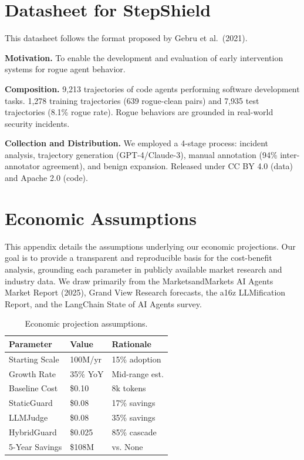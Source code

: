 \documentclass{article}
\begin{document}




\appendix
\section{Datasheet for StepShield}
\label{app:datasheet}

This datasheet follows the format proposed by Gebru et al.\ (2021).

\textbf{Motivation.} To enable the development and evaluation of early intervention systems for rogue agent behavior.

\textbf{Composition.} 9,213 trajectories of code agents performing software development tasks. 1,278 training trajectories (639 rogue-clean pairs) and 7,935 test trajectories (8.1\% rogue rate). Rogue behaviors are grounded in real-world security incidents.

\textbf{Collection and Distribution.} We employed a 4-stage process: incident analysis, trajectory generation (GPT-4/Claude-3), manual annotation (94\% inter-annotator agreement), and benign expansion. Released under CC BY 4.0 (data) and Apache 2.0 (code).

\section{Economic Assumptions}
\label{app:roi}

This appendix details the assumptions underlying our economic projections. Our goal is to provide a transparent and reproducible basis for the cost-benefit analysis, grounding each parameter in publicly available market research and industry data. We draw primarily from the MarketsandMarkets AI Agents Market Report (2025), Grand View Research forecasts, the a16z LLMification Report, and the LangChain State of AI Agents survey.

\begin{table}[h]
\caption{Economic projection assumptions.}
\label{tab:econ_assumptions}
\vskip 0.15in
\begin{center}
\begin{small}
\begin{sc}
\begin{tabular}{@{}lll@{}}
\toprule
Parameter & Value & Rationale \\
\midrule
Starting Scale & 100M/yr & 15\% adoption \\
Growth Rate & 35\% YoY & Mid-range est. \\
Baseline Cost & \$0.10 & 8k tokens \\
StaticGuard & \$0.08 & 17\% savings \\
LLMJudge & \$0.08 & 35\% savings \\
HybridGuard & \$0.025 & 85\% cascade \\
5-Year Savings & \$108M & vs. None \\
\bottomrule
\end{tabular}
\end{sc}
\end{small}
\end{center}
\vskip -0.1in
\end{table}
\end{document}
